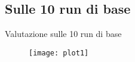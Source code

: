\subsection{Sulle 10 run di base}
\begin{frame}{Valutazione sulle 10 run di base}
	\begin{figure}
	\texttt{[image: plot1]}
	\end{figure}
	
\end{frame}